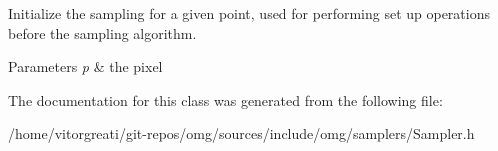 Initialize the sampling for a given point, used for performing set up operations before the sampling algorithm. 


\begin{DoxyParams}{Parameters}
{\em p} & the pixel \\
\hline
\end{DoxyParams}


The documentation for this class was generated from the following file\+:\begin{DoxyCompactItemize}
\item 
/home/vitorgreati/git-\/repos/omg/sources/include/omg/samplers/Sampler.\+h\end{DoxyCompactItemize}
